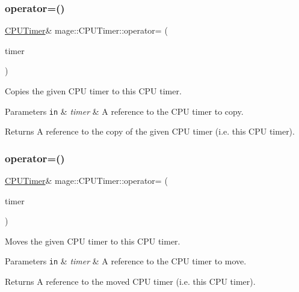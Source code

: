 \subsubsection{\texorpdfstring{operator=()}{operator=()}\hspace{0.1cm}{\footnotesize\ttfamily [1/2]}}
{\footnotesize\ttfamily \hyperlink{classmage_1_1_c_p_u_timer}{C\+P\+U\+Timer}\& mage\+::\+C\+P\+U\+Timer\+::operator= (\begin{DoxyParamCaption}\item[{const \hyperlink{classmage_1_1_c_p_u_timer}{C\+P\+U\+Timer} \&}]{timer }\end{DoxyParamCaption})\hspace{0.3cm}{\ttfamily [default]}}

Copies the given C\+PU timer to this C\+PU timer.


\begin{DoxyParams}[1]{Parameters}
\mbox{\tt in}  & {\em timer} & A reference to the C\+PU timer to copy. \\
\hline
\end{DoxyParams}
\begin{DoxyReturn}{Returns}
A reference to the copy of the given C\+PU timer (i.\+e. this C\+PU timer). 
\end{DoxyReturn}
\hypertarget{classmage_1_1_c_p_u_timer_aee546b06c3b665bc1868abc3d7e3a06d}{}\label{classmage_1_1_c_p_u_timer_aee546b06c3b665bc1868abc3d7e3a06d} 
\subsubsection{\texorpdfstring{operator=()}{operator=()}\hspace{0.1cm}{\footnotesize\ttfamily [2/2]}}
{\footnotesize\ttfamily \hyperlink{classmage_1_1_c_p_u_timer}{C\+P\+U\+Timer}\& mage\+::\+C\+P\+U\+Timer\+::operator= (\begin{DoxyParamCaption}\item[{\hyperlink{classmage_1_1_c_p_u_timer}{C\+P\+U\+Timer} \&\&}]{timer }\end{DoxyParamCaption})\hspace{0.3cm}{\ttfamily [default]}}

Moves the given C\+PU timer to this C\+PU timer.


\begin{DoxyParams}[1]{Parameters}
\mbox{\tt in}  & {\em timer} & A reference to the C\+PU timer to move. \\
\hline
\end{DoxyParams}
\begin{DoxyReturn}{Returns}
A reference to the moved C\+PU timer (i.\+e. this C\+PU timer). 
\end{DoxyReturn}
\hypertarget{classmage_1_1_c_p_u_timer_acb1a264ae09cea3d96794e3c0af246e7}{}\label{classmage_1_1_c_p_u_timer_acb1a264ae09cea3d96794e3c0af246e7} 
